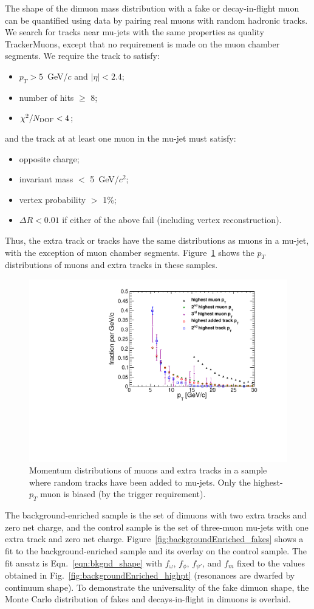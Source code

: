 \documentclass[12pt]{cms-tdr}
\newcommand{\s}[1]{{\mbox{\scriptsize #1}}}
\begin{document}
The shape of the dimuon mass distribution with a fake or
decay-in-flight muon can be quantified using data by pairing real
muons with random hadronic tracks.  We search for tracks near mu-jets
with the same properties as quality TrackerMuons, except that no
requirement is made on the muon chamber segments.  We require the
track to satisfy:
\begin{itemize}
\item $p_T > 5$~GeV/$c$ and $|\eta| < 2.4$;
\item number of hits $\ge$ 8;
\item $\chi^2/N_\s{DOF} < 4$;
\end{itemize}
and the track at at least one muon in the mu-jet must satisfy:
\begin{itemize}
\item opposite charge;
\item invariant mass $<$ 5~GeV/$c^2$;
\item vertex probability $>$ 1\%;
\item $\Delta R < 0.01$ if either of the above fail (including vertex
  reconstruction).
\end{itemize}
Thus, the extra track or tracks have the same distributions as muons
in a mu-jet, with the exception of muon chamber segments.
Figure~\ref{fig:support_mujetplustracks_ptspectra} shows the $p_T$
distributions of muons and extra tracks in these samples.

\begin{figure}
\begin{center}
\includegraphics[width=0.5\linewidth]{PLOTS/support_mujetplustracks_ptspectra.pdf}
\end{center}

\caption{Momentum distributions of muons and extra tracks in a sample
  where random tracks have been added to mu-jets.  Only the
  highest-$p_T$ muon is biased (by the trigger
  requirement). \label{fig:support_mujetplustracks_ptspectra}}
\end{figure}

The background-enriched sample is the set of dimuons with two extra
tracks and zero net charge, and the control sample is the set of
three-muon mu-jets with one extra track and zero net charge.
Figure~\ref{fig:backgroundEnriched_fakes} shows a fit to the
background-enriched sample and its overlay on the control sample.  The
fit ansatz is Eqn.~\ref{eqn:bkgnd_shape} with $f_\omega$, $f_\phi$,
$f_{\psi'}$, and $f_m$ fixed to the values obtained in
Fig.~\ref{fig:backgroundEnriched_highpt} (resonances are dwarfed by
continuum shape).  To demonstrate the universality of the fake dimuon
shape, the Monte Carlo distribution of fakes and decays-in-flight in
dimuons is overlaid.
\end{document}
